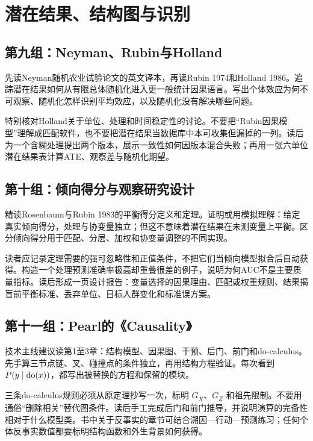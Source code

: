 \section{潜在结果、结构图与识别}

\subsection*{第九组：Neyman、Rubin与Holland}

先读Neyman随机农业试验论文的英文译本，再读Rubin 1974和Holland 1986\parencite{neyman1923,rubin1974,holland1986}。追踪潜在结果如何从有限总体随机化进入更一般统计因果语言。写出个体效应为何不可观察、随机化怎样识别平均效应，以及随机化没有解决哪些问题。

特别核对Holland关于单位、处理和时间稳定性的讨论。不要把“Rubin因果模型”理解成匹配软件，也不要把潜在结果当数据库中本可收集但漏掉的一列。读后为一个含糊处理提出两个版本，展示一致性如何因版本混合失败；再用一张六单位潜在结果表计算ATE、观察差与随机化期望。

\subsection*{第十组：倾向得分与观察研究设计}

精读Rosenbaum与Rubin 1983的平衡得分定义和定理\parencite{rosenbaumrubin1983}。证明或用模拟理解：给定真实倾向得分，处理与协变量独立；但这不意味着潜在结果在未测变量上平衡。区分倾向得分用于匹配、分层、加权和协变量调整的不同实现。

读者应记录定理需要的强可忽略性和正值条件，不把它们当倾向模型拟合后自动获得。构造一个处理预测准确率极高却重叠很差的例子，说明为何AUC不是主要质量指标。读后形成一页设计报告：变量选择的因果理由、匹配或权重规则、结果揭盲前平衡标准、丢弃单位、目标人群变化和标准误方案。

\subsection*{第十一组：Pearl的《Causality》}

技术主线建议读第1至3章：结构模型、因果图、干预、后门、前门和do-calculus\parencite{pearl2009}。先手算三节点链、叉、碰撞点的条件独立，再用结构方程验证。每次看到 $P(y\mid\operatorname{do}(x))$，都写出被替换的方程和保留的模块。

三条do-calculus规则必须从原定理抄写一次，标明 $G_{\bar X}$、$G_{\underline Z}$ 和祖先限制。不要用通俗“删除相关”替代图条件。读后手工完成后门和前门推导，并说明演算的完备性相对于什么模型类。书中关于反事实的章节可结合溯因---行动---预测练习；任何个体反事实数值都要标明结构函数和外生背景如何获得。

